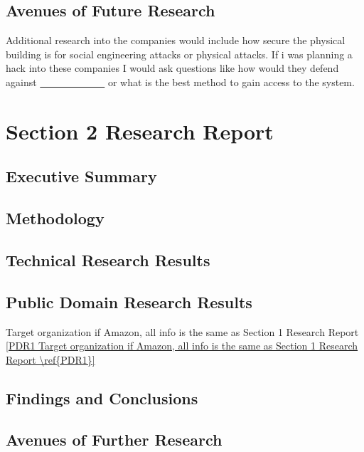 \documentclass[a4paper]{article}
\begin{document}
	\subsection{Avenues of Future Research}
	Additional research into the companies would include how secure the physical building is for
	social engineering attacks or physical attacks. If i was planning a hack into these companies
	I would ask questions like how would they defend against \underline{\ \ \ \ \ \ \ \ \ \ \ \ \ }
	or what is the best method to gain access to the system.
	
	\section{Section 2 Research Report}
	\subsection{Executive Summary}
	
	\subsection{Methodology}

	\subsection{Technical Research Results}
	
	\subsection{Public Domain Research Results}
	Target organization if Amazon, all info is the same as Section 1 Research Report \ref{PDR1	Target organization if Amazon, all info is the same as Section 1 Research Report \ref{PDR1}}
	\subsection{Findings and Conclusions}

	\subsection{Avenues of Further Research}
\end{document}
